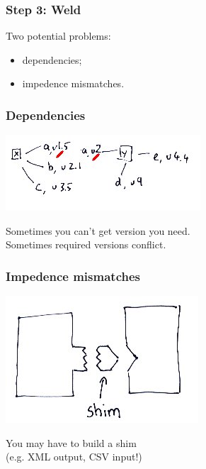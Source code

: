 \begin{frame}
\frametitle{Step 3: Weld}
\begin{changemargin}{1cm}
\Large
Two potential problems:
\begin{itemize}
\item dependencies;
\item impedence mismatches.
\end{itemize}
\end{changemargin}
\end{frame}

\begin{frame}
\frametitle{Dependencies}

\begin{center}
\includegraphics[width=.8\textwidth]{images/dependencies}
\end{center}

\begin{changemargin}{1cm}
\Large
Sometimes you can't get version you need.\\[1em]
Sometimes required versions conflict.
\end{changemargin}

\end{frame}

\begin{frame}
\frametitle{Impedence mismatches}

\begin{center}
\includegraphics[width=.7\textwidth]{images/shim}
\end{center}

\begin{changemargin}{1cm}
\Large
\item You may have to build a shim\\ \qquad (e.g. XML output, CSV input!)
\end{changemargin}

\end{frame}

